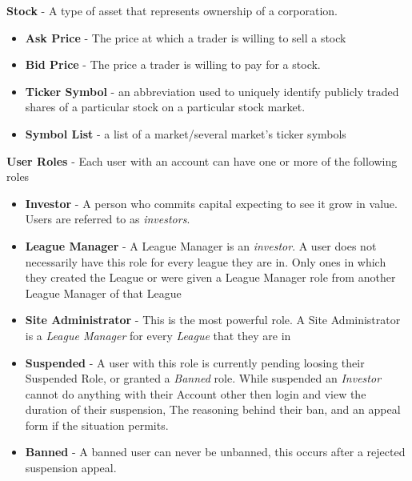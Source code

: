 {\textbf{Stock} - A type of asset that represents ownership of a corporation.
\begin{itemize}
\item \textbf{Ask Price} - The price at which a trader is willing to sell a stock
\item \textbf{Bid Price} - The price a trader is willing to pay for a stock.
\item \textbf{Ticker Symbol} - an abbreviation used to uniquely identify publicly traded shares of a particular stock on a particular stock market.
\item \textbf{Symbol List} - a list of a market/several market's ticker symbols
\end{itemize}
\textbf{User Roles} - Each user with an account can have one or more of the following roles
\begin{itemize}
\item \textbf{Investor} - A person who commits capital expecting to see it grow in value. Users are referred 
to as \emph{investors}.
\item \textbf{League Manager} - A League Manager is an \emph{investor}.  A user does not necessarily have this role for every league they are in.  Only ones in which they created the League or were given a League Manager role from another League Manager of that League 
\item \textbf{Site Administrator} - This is the most powerful role. A Site Administrator is a \emph{League Manager} for every \emph{League} that they are in
\item \textbf{Suspended} - A user with this role is currently pending loosing their Suspended Role, or granted a \emph{Banned} role.  While suspended an \emph{Investor} cannot do anything with their Account other then login and view the duration of their suspension, The reasoning behind their ban, and an appeal form if the situation permits.
\item \textbf{Banned} - A banned user can never be unbanned, this occurs after a rejected suspension appeal.
\end{itemize}
}